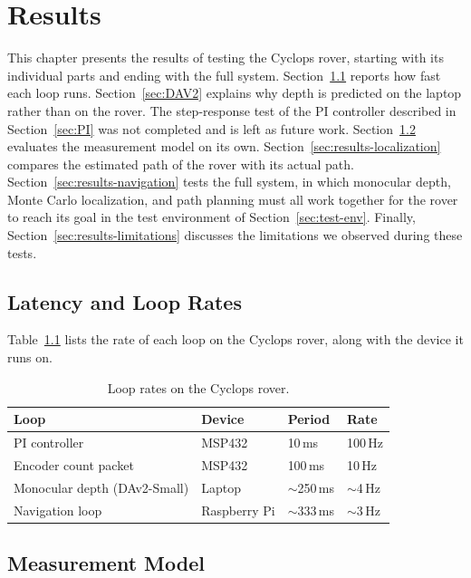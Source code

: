 \chapter{Results}
\label{ch:results}

This chapter presents the results of testing the Cyclops rover, starting with its individual
parts and ending with the full system. Section~\ref{sec:results-latency} reports how fast each
loop runs. Section~\ref{sec:DAV2} explains why depth is predicted on the laptop rather than on
the rover.
The step-response test of the PI controller described in Section~\ref{sec:PI} was not
completed and is left as future work. Section~\ref{sec:results-measurement} evaluates the
measurement model on its own. Section~\ref{sec:results-localization} compares the
estimated path of the rover with its actual path. Section~\ref{sec:results-navigation}
tests the full system, in which monocular depth, Monte Carlo localization, and path planning
must all work together for the rover to reach its goal in the test environment of
Section~\ref{sec:test-env}. Finally, Section~\ref{sec:results-limitations} discusses the
limitations we observed during these tests.

\section{Latency and Loop Rates}
\label{sec:results-latency}

Table~\ref{tab:loop-rates} lists the rate of each loop on the Cyclops rover, along with the
device it runs on.

\begin{table}[htbp]
  \centering
  \caption{Loop rates on the Cyclops rover.}
  \label{tab:loop-rates}
  \small
  \begin{tabular}{l l l l}
    \hline
    Loop & Device & Period & Rate \\
    \hline
    PI controller             & MSP432       & 10\,ms          & 100\,Hz \\
    Encoder count packet      & MSP432       & 100\,ms         & 10\,Hz \\
    Monocular depth (DAv2-Small) & Laptop    & $\sim$250\,ms   & $\sim$4\,Hz \\
    Navigation loop           & Raspberry Pi & $\sim$333\,ms   & $\sim$3\,Hz \\
    \hline
  \end{tabular}
\end{table}

\section{Measurement Model}
\label{sec:results-measurement}

